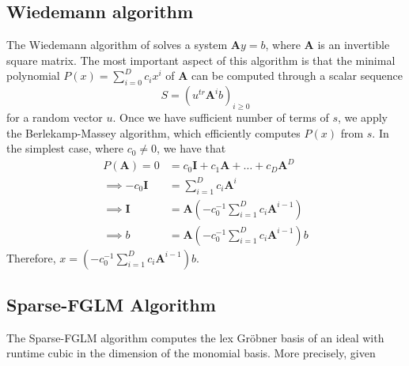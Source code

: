 \documentclass[12pt]{article}
\def\mA{\mathbf{A}}
\def\mI{\mathbf{I}}
\begin{document}
\subsection{Wiedemann algorithm}
The Wiedemann algorithm of \cite{Wiedemann86} solves a system
$\mA y = b$, where $\mA$ is an invertible square matrix. The most
important aspect of this algorithm is that the minimal polynomial
$P(x) = \sum_{i = 0}^{D} c_i x^i$ of $\mA$ can be computed
through a scalar sequence
$$ S = (u^{tr}\mA^ib)_{i \ge 0}$$
for a random vector $u$. Once we have sufficient number of terms
of $s$, we apply the Berlekamp-Massey algorithm, which efficiently
computes $P(x)$ from $s$.
In the simplest case, where $c_0 \neq 0$, we have that
\begin{align*}
P(\mA) = 0 &= c_0 \mI + c_1\mA + \dots + c_D \mA^D \\
\implies -c_0 \mI &= \sum_{i=1}^{D}c_i\mA^i \\
\implies \mI &= \mA(-c_0^{-1} \sum_{i=1}^{D}c_i\mA^{i-1})\\
\implies b &= \mA(-c_0^{-1} \sum_{i=1}^{D}c_i\mA^{i-1})b
\end{align*}
Therefore, $x = (-c_0^{-1} \sum_{i=1}^{D}c_i\mA^{i-1})b$.

\subsection{Sparse-FGLM Algorithm}
The Sparse-FGLM algorithm \cite{FaMo17} computes the lex
Gr\"obner basis of an ideal with runtime cubic in the dimension
of the monomial basis. More precisely, given
\end{document}
